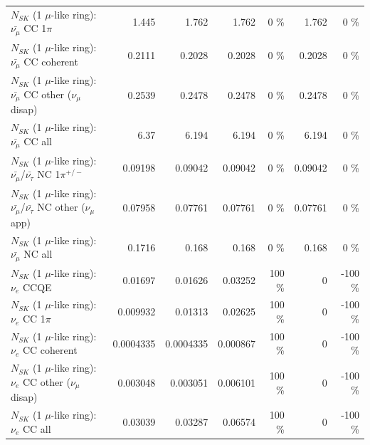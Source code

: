 \begin{table}
\begin{tabular}{| l | r | r | r  r | r  r |}
                         $N_{SK}$ (1 $\mu$-like ring): $\bar{\nu_\mu}$ CC 1$\pi$ &           1.445 &           1.762 &           1.762 &        0 \%  &           1.762 &        0 \%  \\ 
                       $N_{SK}$ (1 $\mu$-like ring): $\bar{\nu_\mu}$ CC coherent &          0.2111 &          0.2028 &          0.2028 &        0 \%  &          0.2028 &        0 \%  \\ 
        $N_{SK}$ (1 $\mu$-like ring): $\bar{\nu_\mu}$ CC other ($\nu_\mu$ disap) &          0.2539 &          0.2478 &          0.2478 &        0 \%  &          0.2478 &        0 \%  \\ 
                          $N_{SK}$ (1 $\mu$-like ring): $\bar{\nu_{\mu}}$ CC all &            6.37 &           6.194 &           6.194 &        0 \%  &           6.194 &        0 \%  \\ 
\hline
  $N_{SK}$ (1 $\mu$-like ring): $\bar{\nu_\mu}$/$\bar{\nu_\tau}$ NC 1$\pi^{+/-}$ &         0.09198 &         0.09042 &         0.09042 &        0 \%  &         0.09042 &        0 \%  \\ 
$N_{SK}$ (1 $\mu$-like ring): $\bar{\nu_\mu}$/$\bar{\nu_\tau}$ NC other ($\nu_\mu$ app) &         0.07958 &         0.07761 &         0.07761 &        0 \%  &         0.07761 &        0 \%  \\ 
                          $N_{SK}$ (1 $\mu$-like ring): $\bar{\nu_{\mu}}$ NC all &          0.1716 &           0.168 &           0.168 &        0 \%  &           0.168 &        0 \%  \\ 
\hline
\hline
\hline
                                      $N_{SK}$ (1 $\mu$-like ring): $\nu_e$ CCQE &         0.01697 &         0.01626 &         0.03252 &      100 \%  &               0 &     -100 \%  \\ 
                                 $N_{SK}$ (1 $\mu$-like ring): $\nu_e$ CC 1$\pi$ &        0.009932 &         0.01313 &         0.02625 &      100 \%  &               0 &     -100 \%  \\ 
                               $N_{SK}$ (1 $\mu$-like ring): $\nu_e$ CC coherent &       0.0004335 &       0.0004335 &        0.000867 &      100 \%  &               0 &     -100 \%  \\ 
                $N_{SK}$ (1 $\mu$-like ring): $\nu_e$ CC other ($\nu_\mu$ disap) &        0.003048 &        0.003051 &        0.006101 &      100 \%  &               0 &     -100 \%  \\ 
                                  $N_{SK}$ (1 $\mu$-like ring): $\nu_{e}$ CC all &         0.03039 &         0.03287 &         0.06574 &      100 \%  &               0 &     -100 \%  \\ 

\end{tabular}
\end{table}
